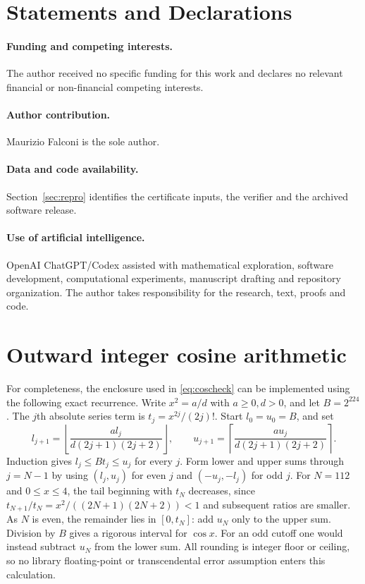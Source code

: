 \documentclass[11pt]{article}
\theoremstyle{definition}
\theoremstyle{remark}
\begin{document}
\section*{Statements and Declarations}
\paragraph{Funding and competing interests.} The author received no
specific funding for this work and declares no relevant financial or
non-financial competing interests.
\paragraph{Author contribution.} Maurizio Falconi is the sole author.
\paragraph{Data and code availability.} Section~\ref{sec:repro} identifies
the certificate inputs, the verifier and the archived software release.
\paragraph{Use of artificial intelligence.} OpenAI ChatGPT/Codex assisted
with mathematical exploration, software development, computational
experiments, manuscript drafting and repository organization. The author
takes responsibility for the research, text, proofs and code.


\clearpage
\appendix


\section{Outward integer cosine arithmetic}\label{app:arithmetic}
For completeness, the enclosure used in \eqref{eq:coscheck} can be
implemented using the following exact recurrence. Write $x^2=a/d$ with
$a\ge0,d>0$, and let $B=2^{224}$. The $j$th absolute series term
is $t_j=x^{2j}/(2j)!$. Start $l_0=u_0=B$, and set
\[
 l_{j+1}=\left\lfloor\frac{a l_j}{d(2j+1)(2j+2)}\right\rfloor,
 \qquad
 u_{j+1}=\left\lceil\frac{a u_j}{d(2j+1)(2j+2)}\right\rceil.
\]
Induction gives $l_j\le Bt_j\le u_j$ for every $j$. Form lower and
upper sums through $j=N-1$ by using $(l_j,u_j)$ for even $j$ and
$(-u_j,-l_j)$ for odd $j$. For $N=112$ and $0\le x\le4$, the
tail beginning with $t_N$ decreases, since
$t_{N+1}/t_N=x^2/((2N+1)(2N+2))<1$ and subsequent ratios are
smaller. As $N$ is even, the remainder lies in $[0,t_N]$: add $u_N$
only to the upper sum. Division by $B$ gives a rigorous interval for
$\cos x$. For an odd cutoff one would instead subtract $u_N$ from the
lower sum. All rounding is integer floor or ceiling, so no library
floating-point or transcendental error assumption enters this calculation.
\end{document}
